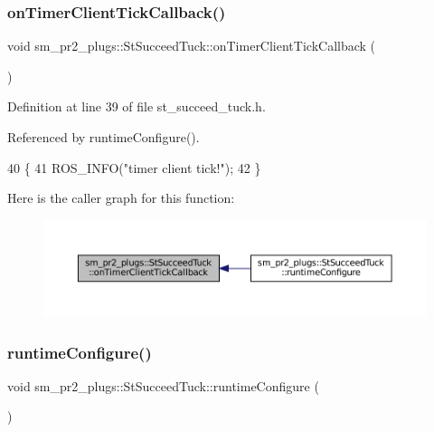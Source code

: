 \subsubsection{\texorpdfstring{on\+Timer\+Client\+Tick\+Callback()}{onTimerClientTickCallback()}}
{\footnotesize\ttfamily void sm\+\_\+pr2\+\_\+plugs\+::\+St\+Succeed\+Tuck\+::on\+Timer\+Client\+Tick\+Callback (\begin{DoxyParamCaption}{ }\end{DoxyParamCaption})\hspace{0.3cm}{\ttfamily [inline]}}



Definition at line 39 of file st\+\_\+succeed\+\_\+tuck.\+h.



Referenced by runtime\+Configure().


\begin{DoxyCode}
40     \{
41         ROS\_INFO(\textcolor{stringliteral}{"timer client tick!"});
42     \}
\end{DoxyCode}
Here is the caller graph for this function\+:
\nopagebreak
\begin{figure}[H]
\begin{center}
\leavevmode
\includegraphics[width=350pt]{structsm__pr2__plugs_1_1StSucceedTuck_af9f7556acf968aaa20d4e3eafda7f3ef_icgraph}
\end{center}
\end{figure}
\mbox{\label{structsm__pr2__plugs_1_1StSucceedTuck_a1cdbe59c4fb6a107b2886745c13e6bc1}} 
\subsubsection{\texorpdfstring{runtime\+Configure()}{runtimeConfigure()}}
{\footnotesize\ttfamily void sm\+\_\+pr2\+\_\+plugs\+::\+St\+Succeed\+Tuck\+::runtime\+Configure (\begin{DoxyParamCaption}{ }\end{DoxyParamCaption})\hspace{0.3cm}{\ttfamily [inline]}}




